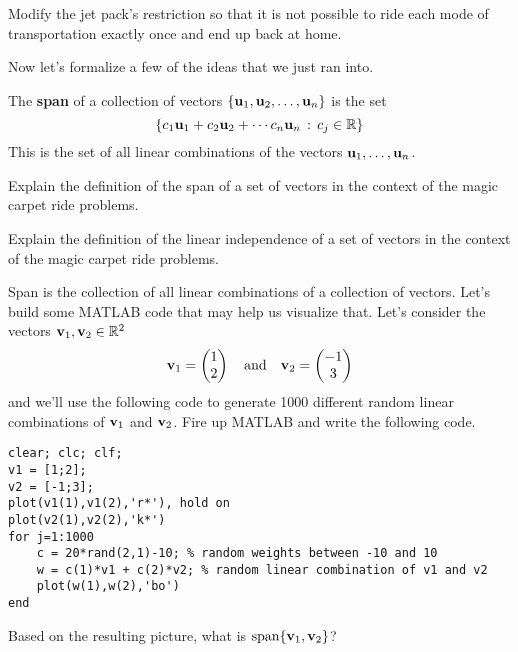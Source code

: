 \begin{problem}
    Modify the jet pack's restriction so that it is not possible to ride each mode of
    transportation exactly once and end up back at home.
\end{problem}

Now let's formalize a few of the ideas that we just ran into.
\begin{definition}
    The {\bf span} of a collection of vectors $\{{\bf u}_1,{\bf u}_2,\ldots,{\bf u}_n\}$ is the set \[
    \{ c_1 {\bf u}_1 + c_2 {\bf u}_2 + \cdots c_n {\bf u}_n \, : \, c_j \in \mathbb{R} \} \] This is
    the set of all linear combinations of the vectors ${\bf u}_1, \ldots, {\bf u}_n$.
\end{definition}

\begin{problem}
    Explain the definition of the span of a set of vectors in the context of the magic
    carpet ride problems.
\end{problem}

\begin{problem}
    Explain the definition of the linear independence of a set of vectors in the context
    of the magic carpet ride problems.
\end{problem}

\begin{problem}\label{prob:MATLAB_span}
    Span is the collection of all linear combinations of a collection of vectors.  Let's
    build some MATLAB code that may help us visualize that. Let's consider the vectors
    ${\bf v}_1, {\bf v}_2 \in \mathbb{R}^2$
    \[ {\bf v}_1 = \begin{pmatrix} 1 \\ 2 \end{pmatrix} \quad \text{and} \quad {\bf v}_2 =
            \begin{pmatrix} -1 \\ 3 \end{pmatrix} \]
    and we'll use the following code to generate 1000 different random linear combinations
    of ${\bf v}_1$ and ${\bf v}_2$.  Fire up MATLAB and write the following code.
\begin{lstlisting}
clear; clc; clf;
v1 = [1;2];
v2 = [-1;3];
plot(v1(1),v1(2),'r*'), hold on
plot(v2(1),v2(2),'k*')
for j=1:1000
    c = 20*rand(2,1)-10; % random weights between -10 and 10
    w = c(1)*v1 + c(2)*v2; % random linear combination of v1 and v2
    plot(w(1),w(2),'bo')
end
\end{lstlisting}
Based on the resulting picture, what is $\text{span}\{{\bf v}_1,{\bf v}_2\}$?
\end{problem}

